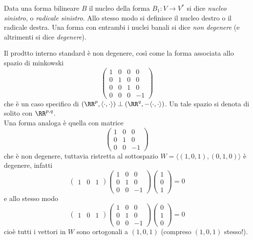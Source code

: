 \documentclass[11pt]{scrartcl}
\begin{document}
	\begin{definition}
		Data una forma bilineare $B$ il nucleo della forma $B_1:V\to V^*$ si dice \textit{nucleo sinistro}, o \textit{radicale sinistro}. Allo stesso modo si definisce il nucleo destro o il radicale destra. Una forma con entrambi i nuclei banali si dice \textit{non degenere} (e altrimenti si dice \textit{degenere}).
	\end{definition}
	\begin{example}
		Il prodtto interno standard è non degenere, così come la forma associata allo spazio di minkowski
		$$
		\begin{pmatrix}
			1 & 0 & 0 & 0 \\
			0 & 1 & 0 & 0 \\
			0 & 0 & 1 & 0 \\
			0 & 0 & 0 & -1 
		\end{pmatrix}
		$$
		che è un caso specifico di $\left(\RR^p, \langle \cdot,\cdot \rangle\right)\perp \left(\RR^q,-\langle \cdot,\cdot \rangle\right)$. Un tale spazio si denota di solito con $\RR^{p,q}$. \\
		Una forma analoga è quella con matrice
		$$
		\begin{pmatrix}
			1 & 0 & 0 \\
			0 & 1 & 0 \\
			0 & 0 & -1
		\end{pmatrix}
		$$
		che è non degenere, tuttavia ristretta al sottospazio $W=\langle (1,0,1),(0,1,0) \rangle$ è degenere, infatti 
		$$
		\begin{pmatrix}
			1 & 0 & 1
		\end{pmatrix}
		\begin{pmatrix}
			1 & 0 & 0 \\
			0 & 1 & 0 \\
			0 & 0 & -1
		\end{pmatrix}
		\begin{pmatrix}
			1 \\ 
			0 \\
			1
		\end{pmatrix}=0
		$$
		e allo stesso modo
		$$
		\begin{pmatrix}
			1 & 0 & 1
		\end{pmatrix}
		\begin{pmatrix}
			1 & 0 & 0 \\
			0 & 1 & 0 \\
			0 & 0 & -1
		\end{pmatrix}
		\begin{pmatrix}
			0 \\ 
			1 \\
			0
		\end{pmatrix}=0
		$$
		cioè tutti i vettori in $W$ sono ortogonali a $(1,0,1)$ (compreso $(1,0,1)$ stesso!).
	\end{example}
\end{document}
